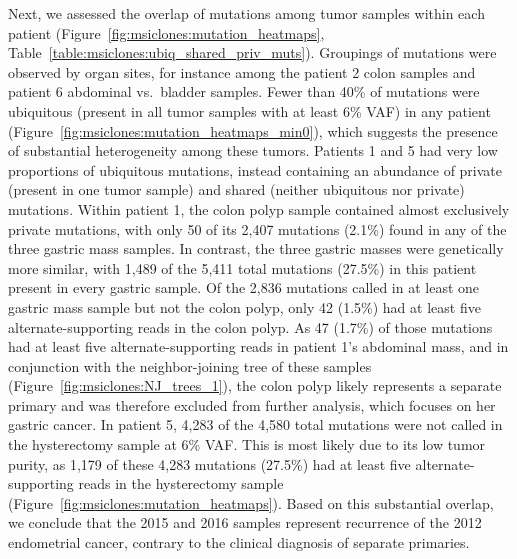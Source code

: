 Next, we assessed the overlap of mutations among tumor samples within each patient (Figure~\ref{fig:msiclones:mutation_heatmaps}, Table~\ref{table:msiclones:ubiq_shared_priv_muts}). Groupings of mutations were observed by organ sites, for instance among the patient 2 colon samples and patient 6 abdominal vs.\ bladder samples. Fewer than 40\% of mutations were ubiquitous (present in all tumor samples with at least 6\% VAF) in any patient (Figure~\ref{fig:msiclones:mutation_heatmaps_min0}), which suggests the presence of substantial heterogeneity among these tumors. Patients 1 and 5 had very low proportions of ubiquitous mutations, instead containing an abundance of private (present in one tumor sample) and shared (neither ubiquitous nor private) mutations. Within patient 1, the colon polyp sample contained almost exclusively private mutations, with only 50 of its 2,407 mutations (2.1\%) found in any of the three gastric mass samples. In contrast, the three gastric masses were genetically more similar, with 1,489 of the 5,411 total mutations (27.5\%) in this patient present in every gastric sample. Of the 2,836 mutations called in at least one gastric mass sample but not the colon polyp, only 42 (1.5\%) had at least five alternate-supporting reads in the colon polyp. As 47 (1.7\%) of those mutations had at least five alternate-supporting reads in patient 1's abdominal mass, and in conjunction with the neighbor-joining tree of these samples (Figure~\ref{fig:msiclones:NJ_trees_1}), the colon polyp likely represents a separate primary and was therefore excluded from further analysis, which focuses on her gastric cancer. In patient 5, 4,283 of the 4,580 total mutations were not called in the hysterectomy sample at 6\% VAF\@. This is most likely due to its low tumor purity, as 1,179 of these 4,283 mutations (27.5\%) had at least five alternate-supporting reads in the hysterectomy sample (Figure~\ref{fig:msiclones:mutation_heatmaps}). Based on this substantial overlap, we conclude that the 2015 and 2016 samples represent recurrence of the 2012 endometrial cancer, contrary to the clinical diagnosis of separate primaries.

